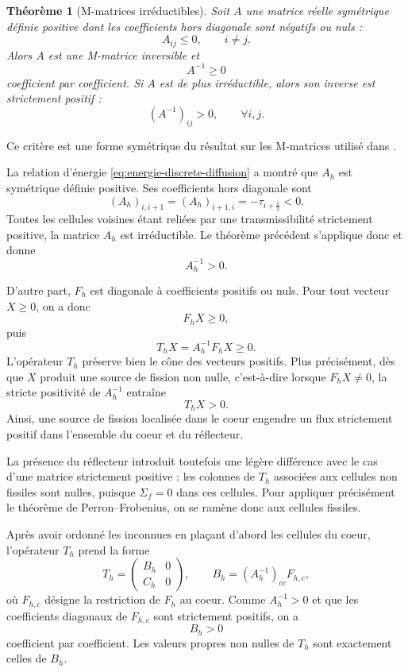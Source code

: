 \documentclass{article}
\newtheorem{theorem}{Théorème}[section]
\begin{document}
\begin{theorem}[M-matrices irréductibles]
    Soit $A$ une matrice réelle symétrique définie positive dont les
    coefficients hors diagonale sont négatifs ou nuls :
    \[
        A_{ij}\leq0,
        \qquad i\neq j.
    \]
    Alors $A$ est une M-matrice inversible et
    \[
        A^{-1}\geq0
    \]
    coefficient par coefficient. Si $A$ est de plus irréductible, alors
    son inverse est strictement positif :
    \[
        (A^{-1})_{ij}>0,
        \qquad \forall i,j.
    \]
\end{theorem}
Ce critère est une forme symétrique du résultat sur les M-matrices utilisé dans \cite[chap.~6, section~6.2]{Allaire2018}.

La relation d'énergie \eqref{eq:energie-discrete-diffusion} a montré que
$A_h$ est symétrique définie positive. Ses coefficients hors diagonale
sont
\[
    (A_h)_{i,i+1}
    =
    (A_h)_{i+1,i}
    =
    -\tau_{i+\frac12}<0.
\]
Toutes les cellules voisines étant reliées par une transmissibilité
strictement positive, la matrice $A_h$ est irréductible. Le théorème
précédent s'applique donc et donne
\begin{equation}
    A_h^{-1}>0.
    \label{eq:inverse-positive}
\end{equation}

D'autre part, $F_h$ est diagonale à coefficients positifs ou nuls. Pour
tout vecteur $X\geq0$, on a donc
\[
    F_hX\geq0,
\]
puis
\begin{equation}
    T_hX=A_h^{-1}F_hX\geq0.
    \label{eq:positivite-Th}
\end{equation}
L'opérateur $T_h$ préserve bien le cône des vecteurs positifs. Plus
précisément, dès que $X$ produit une source de fission non nulle,
c'est-à-dire lorsque $F_hX\neq0$, la stricte positivité de $A_h^{-1}$
entraîne
\begin{equation}
    T_hX>0.
    \label{eq:positivite-forte-Th}
\end{equation}
Ainsi, une source de fission localisée dans le coeur engendre un flux
strictement positif dans l'ensemble du coeur et du réflecteur.

La présence du réflecteur introduit toutefois une légère différence
avec le cas d'une matrice strictement positive : les colonnes de $T_h$
associées aux cellules non fissiles sont nulles, puisque
$\Sigma_f=0$ dans ces cellules. Pour appliquer précisément le théorème
de Perron--Frobenius, on se ramène donc aux cellules fissiles.

Après avoir ordonné les inconnues en plaçant d'abord les cellules du
coeur, l'opérateur $T_h$ prend la forme
\[
    T_h
    =
    \begin{pmatrix}
        B_h & 0\\
        C_h & 0
    \end{pmatrix},
    \qquad
    B_h=(A_h^{-1})_{cc}F_{h,c},
\]
où $F_{h,c}$ désigne la restriction de $F_h$ au coeur. Comme
$A_h^{-1}>0$ et que les coefficients diagonaux de $F_{h,c}$ sont
strictement positifs, on a
\[
    B_h>0
\]
coefficient par coefficient. Les valeurs propres non nulles de $T_h$
sont exactement celles de $B_h$.
\end{document}
